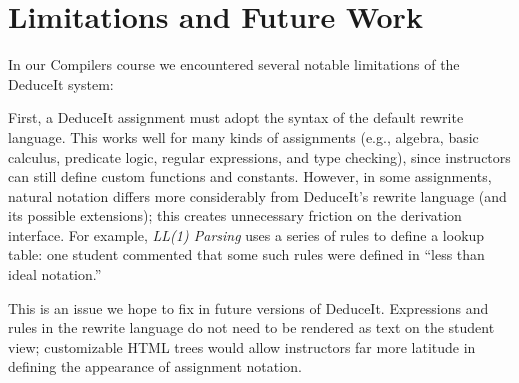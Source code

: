 \documentclass{sigchi}
\begin{document}

% 

\section{Limitations and Future Work}

In our Compilers course we encountered several notable limitations of the DeduceIt system: 

First, a DeduceIt assignment must adopt the syntax of the default rewrite language. This works well for many kinds of assignments (e.g., algebra, basic calculus, predicate logic, regular expressions, and type checking), since instructors can still define custom functions and constants. However, in some assignments, natural notation differs more considerably from DeduceIt's rewrite language (and its possible extensions); this creates unnecessary friction on the derivation interface. For example, \textit{LL(1) Parsing} uses a series of rules to define a lookup table: one student commented that some such rules were defined in ``less than ideal notation.'' %

This is an issue we hope to fix in future versions of DeduceIt. Expressions and rules in the rewrite language do not need to be rendered as text on the student view; customizable HTML trees would allow instructors far more latitude in defining the appearance of assignment notation.
\end{document}
